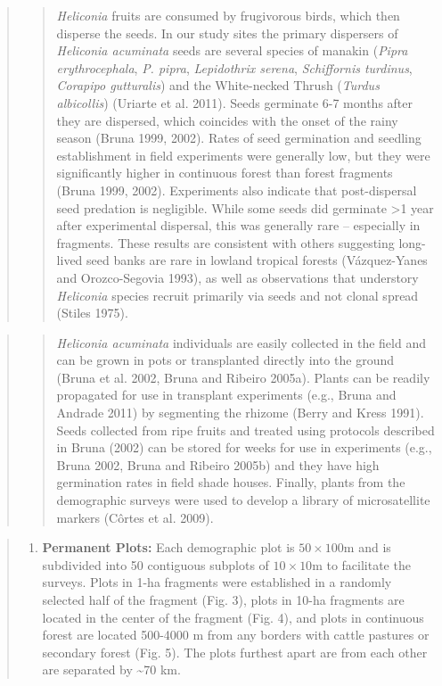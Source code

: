 \documentclass[
  12pt,
  man, donotrepeattitle,floatsintext]{apa6}
\providecommand{\tightlist}{%
  \setlength{\itemsep}{0pt}\setlength{\parskip}{0pt}}
\begin{document}
\begin{quote}
\begin{quote}
\emph{Heliconia} fruits are consumed by frugivorous birds, which then disperse the seeds. In our study sites the primary dispersers of \emph{Heliconia acuminata} seeds are several species of manakin (\emph{Pipra erythrocephala}, \emph{P. pipra}, \emph{Lepidothrix serena}, \emph{Schiffornis turdinus}, \emph{Corapipo gutturalis}) and the White-necked Thrush (\emph{Turdus albicollis}) (Uriarte et al. 2011). Seeds germinate 6-7 months after they are dispersed, which coincides with the onset of the rainy season (Bruna 1999, 2002). Rates of seed germination and seedling establishment in field experiments were generally low, but they were significantly higher in continuous forest than forest fragments (Bruna 1999, 2002). Experiments also indicate that post-dispersal seed predation is negligible. While some seeds did germinate \textgreater1 year after experimental dispersal, this was generally rare -- especially in fragments. These results are consistent with others suggesting long-lived seed banks are rare in lowland tropical forests (Vázquez-Yanes and Orozco-Segovia 1993), as well as observations that understory \emph{Heliconia} species recruit primarily via seeds and not clonal spread (Stiles 1975).
\end{quote}
\end{quote}

\begin{quote}
\begin{quote}
\emph{Heliconia acuminata} individuals are easily collected in the field and can be grown in pots or transplanted directly into the ground (Bruna et al. 2002, Bruna and Ribeiro 2005a). Plants can be readily propagated for use in transplant experiments (e.g., Bruna and Andrade 2011) by segmenting the rhizome (Berry and Kress 1991). Seeds collected from ripe fruits and treated using protocols described in Bruna (2002) can be stored for weeks for use in experiments (e.g., Bruna 2002, Bruna and Ribeiro 2005b) and they have high germination rates in field shade houses. Finally, plants from the demographic surveys were used to develop a library of microsatellite markers (Côrtes et al. 2009).
\end{quote}
\end{quote}

\begin{quote}
\begin{enumerate}
\def\labelenumi{\alph{enumi}.}
\setcounter{enumi}{1}
\tightlist
\item
  \textbf{Permanent Plots:} Each demographic plot is \(50\times100\)m and is subdivided into 50 contiguous subplots of \(10\times10\)m to facilitate the surveys. Plots in 1-ha fragments were established in a randomly selected half of the fragment (Fig. 3), plots in 10-ha fragments are located in the center of the fragment (Fig. 4), and plots in continuous forest are located 500-4000 m from any borders with cattle pastures or secondary forest (Fig. 5). The plots furthest apart are from each other are separated by \textasciitilde70 km.
\end{enumerate}
\end{quote}
\end{document}
